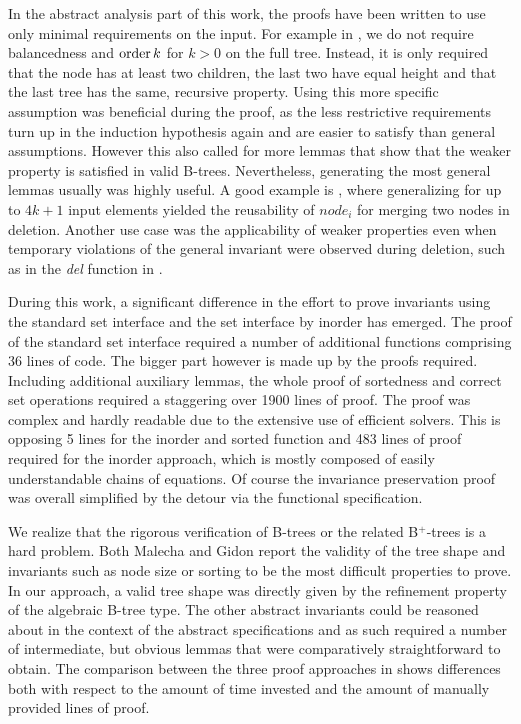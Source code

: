 In the abstract analysis part of this work,
the proofs have been written to use only
minimal requirements on the input.
For example in , 
we do not require balancedness and $\operatorname{order} k$ for $k > 0$ on the full tree.
Instead, it is only required that the node has at least two children,
the last two have equal height
and that the last tree has the same, recursive property.
Using this more specific assumption was beneficial during the proof,
as the less restrictive requirements turn up in the
induction hypothesis again and are easier to satisfy than general assumptions.
However this also called for more lemmas that show that
the weaker property is satisfied in valid B-trees.
Nevertheless, generating the most general lemmas usually was highly useful.
A good example is ,
where generalizing for up to $4k+1$ input elements yielded the reusability of
$node_i$ for merging two nodes in deletion.
Another use case was the applicability of weaker properties
even when temporary violations
of the general invariant were observed during deletion,
such as in the \textit{del} function in .

During this work, a significant difference in the effort
to prove invariants using the standard set interface
and the set interface by inorder has emerged.
The proof of the standard set interface required a number of additional functions
comprising 36 lines of code.
The bigger part however is made up by the proofs required.
Including additional auxiliary lemmas, the whole proof of sortedness
and correct set operations required a staggering over 1900 lines of proof.
The proof was complex and hardly readable due to the 
extensive use of efficient solvers.
This is opposing 5 lines for the inorder and sorted function and
483 lines of proof required for the inorder approach,
which is mostly composed of easily understandable chains of equations.
Of course the invariance preservation proof
was overall simplified by the detour via the functional specification.

We realize that the rigorous verification of B-trees or the related B$^+$-trees
is a hard problem.
Both Malecha \parencite{DBLP:conf/popl/MalechaMSW10} and Gidon \parencite{DBLP:journals/sosym/ErnstSR15}
report the validity of the tree shape
and invariants such as node size or sorting
to be the most difficult properties to prove.
In our approach, a valid tree shape was directly given
by the refinement property of the algebraic B-tree type.
The other abstract invariants could be reasoned about
in the context of the abstract specifications and as such
required a number of intermediate, but obvious
lemmas that were comparatively straightforward to obtain.
The comparison between the three proof approaches in 
shows differences both with respect to the amount of 
time invested and the amount of manually provided lines of proof.
    
